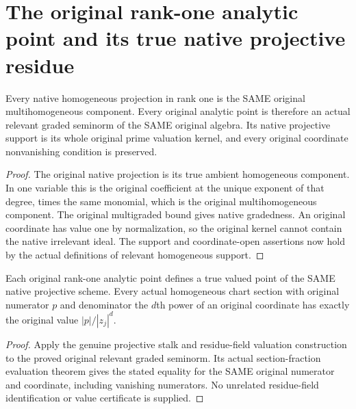 \section{The original rank-one analytic point and its true native projective residue}

\begin{lemma}
\label{lem:fc-native-rank-one-analytic-support}
\leanok
{}
Every native homogeneous projection in rank one is the SAME original
multihomogeneous component. Every original analytic point is therefore
an actual relevant graded seminorm of the SAME original algebra. Its
native projective support is its whole original prime valuation kernel,
and every original coordinate nonvanishing condition is preserved.
\end{lemma}
\begin{proof}
The original native projection is its true ambient homogeneous
component. In one variable this is the original coefficient at the
unique exponent of that degree, times the same monomial, which is the
original multihomogeneous component. The original multigraded bound
gives native gradedness. An original coordinate has value one by
normalization, so the original kernel cannot contain the native
irrelevant ideal. The support and coordinate-open assertions now hold
by the actual definitions of relevant homogeneous support.
\end{proof}

\begin{theorem}
\label{thm:fc-native-rank-one-analytic-point}
\leanok
{}
Each original rank-one analytic point defines a true valued point of the
SAME native projective scheme. Every actual homogeneous chart section
with original numerator $p$ and denominator the $d$th power of an
original coordinate has exactly the original value
$|p|/|z_j|^d$.
\end{theorem}
\begin{proof}
Apply the genuine projective stalk and residue-field valuation
construction to the proved original relevant graded seminorm. Its
actual section-fraction evaluation theorem gives the stated equality
for the SAME original numerator and coordinate, including vanishing
numerators. No unrelated residue-field identification or value
certificate is supplied.
\end{proof}
